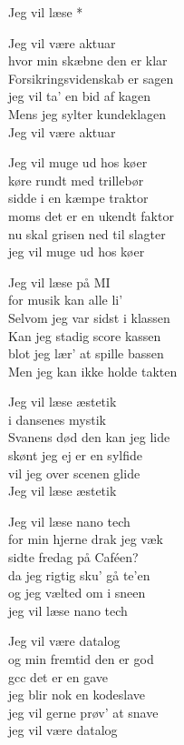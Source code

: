 \begin{song}{Jeg vil læse *}
  \begin{SBVerse}
    Jeg vil være aktuar\\
    hvor min skæbne den er klar\\
    Forsikringsvidenskab er sagen\\
    jeg vil ta' en bid af kagen\\
    Mens jeg sylter kundeklagen\\
    Jeg vil være aktuar
  \end{SBVerse}

  \begin{SBVerse}
    Jeg vil muge ud hos køer\\
    køre rundt med trillebør\\
    sidde i en kæmpe traktor\\
    moms det er en ukendt faktor\\
    nu skal grisen ned til slagter\\
    jeg vil muge ud hos køer
  \end{SBVerse}

  \begin{SBVerse}
    Jeg vil læse på MI\\
    for musik kan alle li'\\
    Selvom jeg var sidst i klassen\\
    Kan jeg stadig score kassen\\
    blot jeg lær' at spille bassen\\
    Men jeg kan ikke holde takten
  \end{SBVerse}

  \begin{SBVerse}
    Jeg vil læse æstetik\\
    i dansenes mystik\\
    Svanens død den kan jeg lide\\
    skønt jeg ej er en sylfide\\
    vil jeg over scenen glide\\
    Jeg vil læse æstetik
  \end{SBVerse}

  \begin{SBVerse}
    Jeg vil læse nano tech\\
    for min hjerne drak jeg væk\\
    sidte fredag på Caféen?\\
    da jeg rigtig sku' gå te'en\\
    og jeg vælted om i sneen\\
    jeg vil læse nano tech
  \end{SBVerse}

  \begin{SBVerse}
    Jeg vil være datalog\\
    og min fremtid den er god\\
    gcc det er en gave\\
    jeg blir nok en kodeslave\\
    jeg vil gerne prøv' at snave\\
    jeg vil være datalog
  \end{SBVerse}
\end{song}